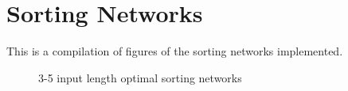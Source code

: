 \section{Sorting Networks}\label{app:sort-networks}
This is a compilation of figures of the sorting networks implemented.
\begin{figure}[htb]
 \centering
    \begin{subfigure}[b]{0.3\textwidth}
        \centering
        \begin{sortingnetwork}{3}{0.4}
            \addtocounter{sncolumncounter}{2}
            \addtocounter{sncolumncounter}{2}
        \end{sortingnetwork}
    \end{subfigure}
    \begin{subfigure}[b]{0.3\textwidth}
        \centering
        \begin{sortingnetwork}{4}{0.4}
            \addtocounter{sncolumncounter}{2}
            \addtocounter{sncolumncounter}{2}
        \end{sortingnetwork}
    \end{subfigure}
    \begin{subfigure}[b]{0.33\textwidth}
        \centering
        \begin{sortingnetwork}{5}{0.4}
            \addtocounter{sncolumncounter}{2}
            \addtocounter{sncolumncounter}{2}
            \addtocounter{sncolumncounter}{2}
            \addtocounter{sncolumncounter}{2}
        \end{sortingnetwork}
    \end{subfigure}
 \caption{3-5 input length optimal sorting networks \cite{ron-zeno}}
 \label{fig:sort-5}
\end{figure}


